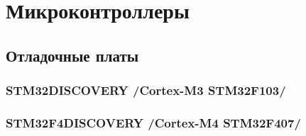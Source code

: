 \part{Микроконтроллеры \cmx}

\chapter{Отладочные платы}\label{devkitcmx}

\section{STM32DISCOVERY /Cortex-M3 STM32F103/}

\section{STM32F4DISCOVERY /Cortex-M4 STM32F407/}

